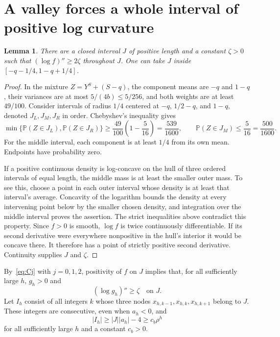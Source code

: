 \documentclass[11pt]{article}
\newtheorem{lemma}[theorem]{Lemma}
\newcommand{\Pp}{\mathbb P}
\begin{document}
\section{A valley forces a whole interval of positive log curvature}
\begin{lemma}\label{lem:valley}
There are a closed interval $J$ of positive length and a constant
$\zeta>0$ such that $(\log f)''\ge2\zeta$ throughout $J$.
One can take $J$ inside $[-q-1/4,1-q+1/4]$.
\end{lemma}
\begin{proof}
In the mixture $Z=Y^S+(S-q)$, the component means are $-q$ and $1-q$,
their variances are at most $5/(4b)\le5/256$, and both weights are at
least $49/100$. Consider intervals of radius $1/4$ centered at $-q$,
$1/2-q$, and $1-q$, denoted $J_L,J_M,J_R$ in order. Chebyshev's
inequality gives
\[
 \min\{\Pp(Z\in J_L),\Pp(Z\in J_R)\}
 \ge\frac{49}{100}\left(1-\frac5{16}\right)=\frac{539}{1600},
 \qquad
 \Pp(Z\in J_M)\le\frac5{16}=\frac{500}{1600}.
\]
For the middle interval, each component is at least $1/4$ from its own
mean. Endpoints have probability zero.

If a positive continuous density is log-concave on the hull of three
ordered intervals of equal length, the middle mass is at least the
smaller outer mass. To see this, choose a point in each outer interval
whose density is at least that interval's average. Concavity of the
logarithm bounds the density at every intervening point below by the
smaller chosen density, and integration over the middle interval proves
the assertion. The strict inequalities above contradict this property.
Since $f>0$ is smooth, $\log f$ is twice continuously differentiable.
If its second derivative were everywhere nonpositive in the hull's
interior it would be concave there. It therefore has a point of strictly
positive second derivative. Continuity supplies $J$ and $\zeta$.
\end{proof}

By~\eqref{eq:Cj} with $j=0,1,2$, positivity of $f$ on $J$ implies that,
for all sufficiently large $h$, $g_h>0$ and
\begin{equation}\label{eq:curvature}
 (\log g_h)''\ge\zeta\quad\text{on }J.
\end{equation}
Let $I_h$ consist of all integers $k$ whose three nodes
$x_{h,k-1},x_{h,k},x_{h,k+1}$ belong to $J$. These integers are
consecutive, even when $a_h<0$, and
\begin{equation}\label{eq:count}
 |I_h|\ge |J||a_h|-4\ge c_b\rho^h
\end{equation}
for all sufficiently large $h$ and a constant $c_b>0$.
\end{document}
